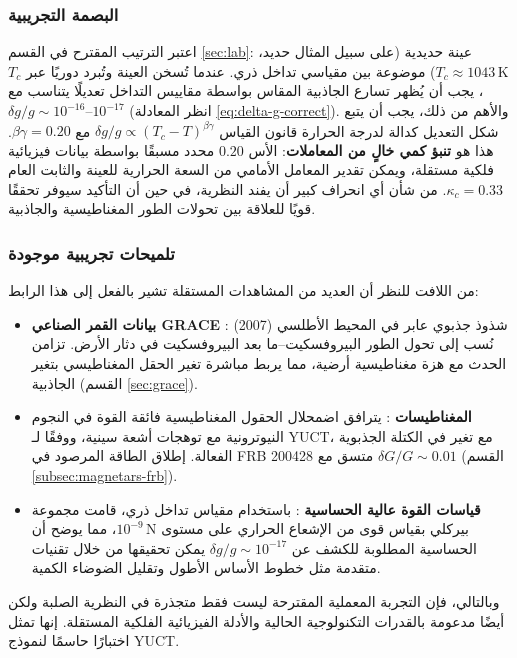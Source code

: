 \documentclass[11pt,a4paper]{article}
\begin{document}
	\subsubsection{البصمة التجريبية}
	اعتبر الترتيب المقترح في القسم \ref{sec:lab}: عينة حديدية (على سبيل المثال حديد، $T_c \approx 1043\,\mathrm{K}$) موضوعة بين مقياسي تداخل ذري. عندما تُسخن العينة وتُبرد دوريًا عبر $T_c$، يجب أن يُظهر تسارع الجاذبية المقاس بواسطة مقاييس التداخل تعديلًا يتناسب مع $\delta g/g \sim 10^{-16}$–$10^{-17}$ (انظر المعادلة \ref{eq:delta-g-correct}). والأهم من ذلك، يجب أن يتبع شكل التعديل كدالة لدرجة الحرارة قانون القياس $\delta g/g \propto (T_c - T)^{\beta\gamma}$ مع $\beta\gamma = 0.20$. هذا هو \textbf{تنبؤ كمي خالٍ من المعاملات}: الأس $0.20$ محدد مسبقًا بواسطة بيانات فيزيائية فلكية مستقلة، ويمكن تقدير المعامل الأمامي من السعة الحرارية للعينة والثابت العام $\kappa_c = 0.33$. من شأن أي انحراف كبير أن يفند النظرية، في حين أن التأكيد سيوفر تحققًا قويًا للعلاقة بين تحولات الطور المغناطيسية والجاذبية.
	
	\subsubsection{تلميحات تجريبية موجودة}
	من اللافت للنظر أن العديد من المشاهدات المستقلة تشير بالفعل إلى هذا الرابط:
	\begin{itemize}
		\item \textbf{بيانات القمر الصناعي GRACE} \cite{Rosat2025}: شذوذ جذبوي عابر في المحيط الأطلسي (2007) نُسب إلى تحول الطور البيروفسكيت–ما بعد البيروفسكيت في دثار الأرض. تزامن الحدث مع هزة مغناطيسية أرضية، مما يربط مباشرة تغير الحقل المغناطيسي بتغير الجاذبية (القسم \ref{sec:grace}).
		\item \textbf{المغناطيسات} \cite{Kaspi2017}: يترافق اضمحلال الحقول المغناطيسية فائقة القوة في النجوم النيوترونية مع توهجات أشعة سينية، ووفقًا لـ YUCT، مع تغير في الكتلة الجذبوية الفعالة. إطلاق الطاقة المرصود في FRB 200428 متسق مع $\delta G/G \sim 0.01$ (القسم \ref{subsec:magnetars-frb}).
		\item \textbf{قياسات القوة عالية الحساسية} \cite{Muller2017}: باستخدام مقياس تداخل ذري، قامت مجموعة بيركلي بقياس قوى من الإشعاع الحراري على مستوى $10^{-9}\,\mathrm{N}$، مما يوضح أن الحساسية المطلوبة للكشف عن $\delta g/g \sim 10^{-17}$ يمكن تحقيقها من خلال تقنيات متقدمة مثل خطوط الأساس الأطول وتقليل الضوضاء الكمية.
	\end{itemize}
	
	وبالتالي، فإن التجربة المعملية المقترحة ليست فقط متجذرة في النظرية الصلبة ولكن أيضًا مدعومة بالقدرات التكنولوجية الحالية والأدلة الفيزيائية الفلكية المستقلة. إنها تمثل اختبارًا حاسمًا لنموذج YUCT.
	
\end{document}
